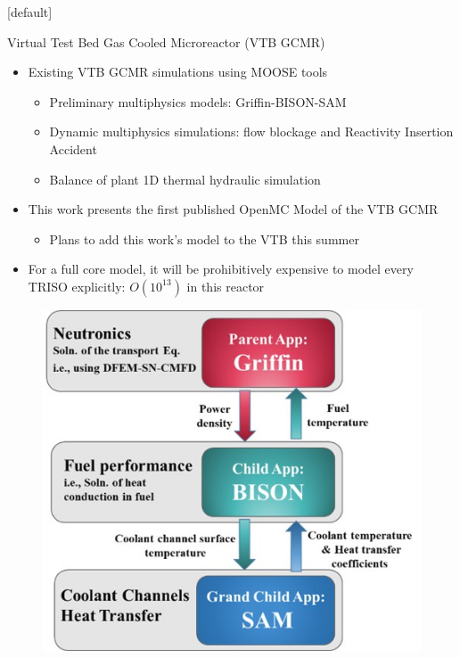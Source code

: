 \documentclass[9pt,t,aspectratio=169]{beamer}
\makeatletter
\newenvironment{withoutheadline}{
       \setbeamertemplate{headline}[default]
       \def\beamer@entrycode{\vspace*{-\headheight}}
    }{}
\makeatother
\begin{document}
\begin{withoutheadline}
\begin{frame}{Virtual Test Bed Gas Cooled Microreactor (VTB GCMR)}
    \pause
    \Large
    \begin{minipage}[t]{0.525\linewidth}
        \begin{itemize}
            \item<2-> Existing VTB GCMR simulations using MOOSE tools
            \begin{itemize}
                \item<2-> Preliminary multiphysics models: Griffin-BISON-SAM \cite{Stauff-preliminary-applications-2021,Stauff-applications-2022,Abdelhameed-ANS-2022}
                \item<2-> Dynamic multiphysics simulations: flow blockage and Reactivity Insertion Accident \cite{HF_MRs_ANL}
                \item<2-> Balance of plant 1D thermal hydraulic simulation \cite{Duchnowski_plant_balance_2022}
            \end{itemize}
            \item<3-> This work presents the first published OpenMC Model of the VTB GCMR
            \begin{itemize}
                \item<3->Plans to add this work's model to the VTB this summer
            \end{itemize}
            \item<4-> For a full core model, it will be prohibitively expensive to model every TRISO explicitly: $O(10^{13})$ in this reactor
        \end{itemize}
    \end{minipage}
    \hfill%
    \begin{minipage}[t]{0.425\linewidth}
        \begin{figure}
            \centering
            \includegraphics[width=\linewidth]{figures/gcmr_preliminary_mutliapps.png}

\end{figure}
\end{minipage}
\end{frame}
\end{withoutheadline}
\end{document}
